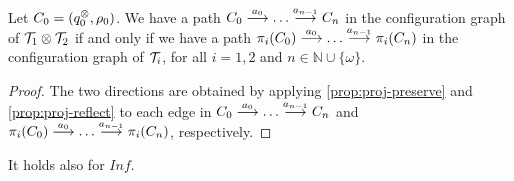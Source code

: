 
\begin{theorem}
Let $C_0 = (q_0^{\otimes},\rho_0)$. We have a path $C_0 \overset{a_0}{\longrightarrow} \dots \overset{a_{n-1}}{\longrightarrow} C_n$ in the configuration graph of $\mathcal{T}_1 \otimes \mathcal{T}_2$ if and only if we have a path $\pi_i(C_0) \overset{a_0}{\longrightarrow} \dots \overset{a_{n-1}}{\longrightarrow} \pi_i(C_n)$ in the configuration graph of $\mathcal{T}_i$, for all $i=1,2$ and $n \in \mathbb{N} \cup \{\omega\}$.
\end{theorem}
\begin{proof}
The two directions are obtained by applying \cref{prop:proj-preserve} and \cref{prop:proj-reflect} to each edge in $C_0 \overset{a_0}{\longrightarrow} \dots \overset{a_{n-1}}{\longrightarrow} C_n$ and $\pi_i(C_0) \overset{a_0}{\longrightarrow} \dots \overset{a_{n-1}}{\longrightarrow} \pi_i(C_n)$, respectively.
\end{proof}

\begin{corollary}
It holds also for $Inf$.
\end{corollary}


